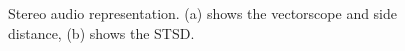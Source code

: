 \begin{figure}[t]
    \centering
    \caption{Stereo audio representation. (a) shows the vectorscope and side distance, (b) shows the STSD.}
    \label{fig:stsd}
\end{figure}
